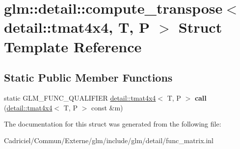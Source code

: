 \hypertarget{structglm_1_1detail_1_1compute__transpose_3_01detail_1_1tmat4x4_00_01_t_00_01_p_01_4}{}\section{glm\+:\+:detail\+:\+:compute\+\_\+transpose$<$ detail\+:\+:tmat4x4, T, P $>$ Struct Template Reference}
\label{structglm_1_1detail_1_1compute__transpose_3_01detail_1_1tmat4x4_00_01_t_00_01_p_01_4}
\subsection*{Static Public Member Functions}
\begin{DoxyCompactItemize}
\item 
static G\+L\+M\+\_\+\+F\+U\+N\+C\+\_\+\+Q\+U\+A\+L\+I\+F\+I\+ER \hyperlink{structglm_1_1detail_1_1tmat4x4}{detail\+::tmat4x4}$<$ T, P $>$ {\bfseries call} (\hyperlink{structglm_1_1detail_1_1tmat4x4}{detail\+::tmat4x4}$<$ T, P $>$ const \&m)\hypertarget{structglm_1_1detail_1_1compute__transpose_3_01detail_1_1tmat4x4_00_01_t_00_01_p_01_4_af9f856179336704a2eab5c72c6ef79e4}{}\label{structglm_1_1detail_1_1compute__transpose_3_01detail_1_1tmat4x4_00_01_t_00_01_p_01_4_af9f856179336704a2eab5c72c6ef79e4}

\end{DoxyCompactItemize}


The documentation for this struct was generated from the following file\+:\begin{DoxyCompactItemize}
\item 
Cadriciel/\+Commun/\+Externe/glm/include/glm/detail/func\+\_\+matrix.\+inl\end{DoxyCompactItemize}
